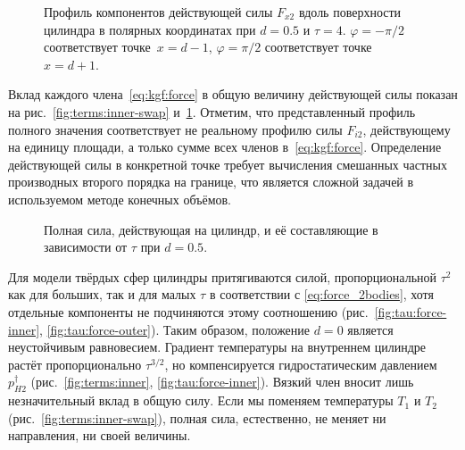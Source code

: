 \begin{figure}[ht]
    \centering
    \caption{Профиль компонентов действующей силы \(F_{x2}\) вдоль поверхности цилиндра
        в полярных координатах при \(d=0.5\) и \(\tau=4\).
        \(\varphi = -\pi/2\) соответствует точке~\(x=d-1\),
        \(\varphi = \pi/2\) соответствует точке~\(x=d+1\).}
    \label{fig:terms}
\end{figure}

Вклад каждого члена~\eqref{eq:kgf:force} в общую величину действующей силы
показан на рис.~\ref{fig:terms:inner-swap} и~\ref{fig:terms}.
Отметим, что представленный профиль полного значения соответствует не реальному профилю силы \(F_{i2}\),
действующему на единицу площади, а только сумме всех членов в~\eqref{eq:kgf:force}.
Определение действующей силы в конкретной точке требует вычисления смешанных частных производных
второго порядка на границе, что является сложной задачей в используемом методе конечных объёмов.

\begin{figure}[ht]
    \centering
    \caption{Полная сила, действующая на цилиндр, и её составляющие в зависимости от \(\tau\) при \(d=0.5\).}
    \label{fig:tau:force}
\end{figure}

Для модели твёрдых сфер цилиндры притягиваются силой, пропорциональной \(\tau^2\)
как для больших, так и для малых \(\tau\) в соответствии с \eqref{eq:force_2bodies},
хотя отдельные компоненты не подчиняются этому соотношению (рис.~\ref{fig:tau:force-inner}, \ref{fig:tau:force-outer}).
Таким образом, положение \(d=0\) является неустойчивым равновесием.
Градиент температуры на внутреннем цилиндре растёт пропорционально \(\tau^{3/2}\),
но компенсируется гидростатическим давлением \(p^\dag_{H2}\) (рис.~\ref{fig:terms:inner}, \ref{fig:tau:force-inner}).
Вязкий член вносит лишь незначительный вклад в общую силу.
Если мы поменяем температуры \(T_1\) и \(T_2\) (рис.~\ref{fig:terms:inner-swap}),
полная сила, естественно, не меняет ни направления, ни своей величины.


